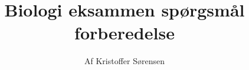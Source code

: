 \title{
    Biologi eksammen spørgsmål forberedelse \\ 
}

\author{Af Kristoffer Sørensen}
\maketitle

\thispagestyle{empty}
\newpage
\tableofcontents
\newpage